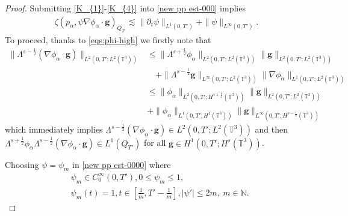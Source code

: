 \documentclass[reqno,a4paper,11pt]{amsart}
\theoremstyle{plain}
\numberwithin{equation}{section}
\newcommand{\bg}{\mathbf{g}}
\begin{document}
\begin{proof}
					
					Submitting \eqref{K_{1}}-\eqref{K_{4}} into \eqref{new pp est-000} implies
					\begin{align}
						\zeta(p_{\alpha},\psi\nabla\phi_{\alpha} \cdot \bg)_{Q_{T'}}\lesssim \|\partial_t\psi\|_{L^{1}(0,T')}+\|\psi\|_{L^{\infty}(0,T')}.\label{new pp est-0000}
					\end{align}
					To proceed, thanks to \eqref{eqs:phi-high} we firstly note that
					\begin{align}
						\nonumber\|\Lambda^{s-\frac{1}{2}}(\nabla \phi_\alpha \cdot \mathbf{g})\|_{L^{2}(0,T';L^{2}(\mathbb{T}^{3}))}&\leq \|\Lambda^{s+\frac{1}{2}} \phi_\alpha\|_{L^{2}(0,T';L^{2}(\mathbb{T}^{3}))}\|\mathbf{g}\|_{L^{2}(0,T';L^{2}(\mathbb{T}^{3}))}
						\\&\nonumber\quad+\|\Lambda^{s-\frac{1}{2}}\mathbf{g}\|_{L^{\infty}(0,T';L^{2}(\mathbb{T}^{3}))}\|\nabla \phi_\alpha\|_{L^{1}(0,T';L^{2}(\mathbb{T}^{3}))}
						\\&\nonumber\leq \|\phi_\alpha\|_{L^{2}(0,T';H^{s+\frac{1}{2}}(\mathbb{T}^{3}))}\|\mathbf{g}\|_{L^{2}(0,T';L^{2}(\mathbb{T}^{3}))}
						\\&+
						\|\phi_\alpha\|_{L^{1}(0,T';H^{1}(\mathbb{T}^{3}))}\|\mathbf{g}\|_{L^{\infty}(0,T';H^{s-\frac{1}{2}}(\mathbb{T}^{3}))}
					\end{align}
					which immediately implies $\Lambda^{s-\frac{1}{2}}(\nabla \phi_\alpha \cdot \mathbf{g})\in L^{2}(0,T';L^{2}(\mathbb{T}^{3}))$ and then  $\Lambda^{s+\frac{1}{2}}\phi_{\alpha}\Lambda^{s-\frac{1}{2}}(\nabla\phi_{\alpha}\cdot\bg)\in L^{1}(Q_{T'})$ for all $\bg\in H^{1}(0,T';H^{s}(\mathbb{T}^{3}))$.
					
					
					Choosing  $\psi=\psi_{m}$ in \eqref{new pp est-0000} where
					\begin{equation*}
						\begin{aligned}
							& \psi_{m}\in C_{0}^{\infty}(0,T'),  0\leq\psi_{m}\leq1,
							\\& \psi_{m}(t)=1, t\in\left[\frac{1}{m},T'-\frac{1}{m}\right], |\psi'|\leq 2m,\ m\in \mathbb{N}.
						\end{aligned}
					\end{equation*}
					

\end{proof}
\end{document}
